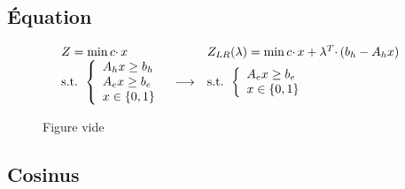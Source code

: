 
\chapter*{}

\section{Équation}

  $$
  \begin{array}{l c l}
    Z = \min c\cdotp x & & Z_{LR}(\lambda) = \min c\cdotp x + \lambda^T\cdotp(b_h - A_hx)\\
    \mbox{s.t. }
      \left\{
        \begin{array}{l}
          A_hx \geq b_h\\
          A_ex \geq b_e\\
          x \in \{0, 1\}
        \end{array}
      \right.
    & \longrightarrow
    & \mbox{s.t. }
      \left\{
        \begin{array}{l}
          A_ex \geq b_e\\
          x \in \{0, 1\}
        \end{array}
      \right.
  \end{array}
  $$
  
  
\begin{figure}
  \caption{Figure vide}
\end{figure}


\section{Cosinus}

\def\b#1{\textcolor{bleu}{#1}}
\def\v#1{\textcolor{violet}{#1}}
\def\r#1{\textcolor{pink}{#1}}
\def\o#1{\textcolor{orange}{#1}}
\def\g#1{\textcolor{vert}{#1}}

